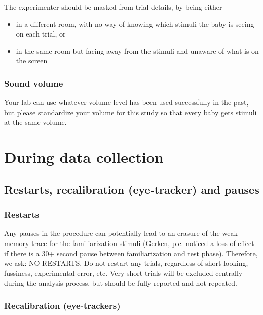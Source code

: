 \documentclass[
  letterpaper,
  DIV=11,
  numbers=noendperiod,
  oneside]{scrreprt}
\begin{document}
The experimenter should be masked from trial details, by being either

\begin{itemize}
\item
  in a different room, with no way of knowing which stimuli the baby is
  seeing on each trial, or
\item
  in the same room but facing away from the stimuli and unaware of what
  is on the screen
\end{itemize}

\subsection{Sound volume}\label{sound-volume}

Your lab can use whatever volume level has been used successfully in the
past, but please standardize your volume for this study so that every
baby gets stimuli at the same volume.

\chapter{During data collection}\label{sec-duringcollection}

\section{Restarts, recalibration (eye-tracker) and
pauses}\label{restarts-recalibration-eye-tracker-and-pauses}

\subsection{Restarts}\label{restarts}

Any pauses in the procedure can potentially lead to an erasure of the
weak memory trace for the familiarization stimuli (Gerken, p.c. noticed
a loss of effect if there is a 30+ second pause between familiarization
and test phase). Therefore, we ask: NO RESTARTS. Do not restart any
trials, regardless of short looking, fussiness, experimental error, etc.
Very short trials will be excluded centrally during the analysis
process, but should be fully reported and not repeated.

\subsection{Recalibration
(eye-trackers)}\label{recalibration-eye-trackers}
\end{document}
